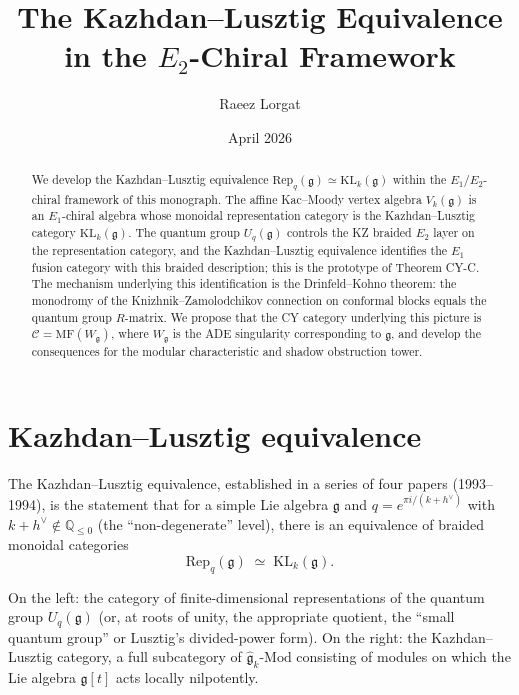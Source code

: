 \documentclass[11pt]{article}
\title{The Kazhdan--Lusztig Equivalence\\in the $E_2$-Chiral Framework}
\author{Raeez Lorgat}
\date{April 2026}
\theoremstyle{definition}
\theoremstyle{remark}
\newcommand{\Mod}{\mathrm{Mod}}
\newcommand{\Rep}{\mathrm{Rep}}
\newcommand{\MF}{\mathrm{MF}}
\newcommand{\Uq}{U_q}
\newcommand{\cC}{\mathcal{C}}
\newcommand{\frakg}{\mathfrak{g}}
\newcommand{\KL}{\mathrm{KL}}
\newcommand{\hv}{h^\vee}
\begin{document}
\maketitle

\begin{abstract}
We develop the Kazhdan--Lusztig equivalence $\Rep_q(\frakg) \simeq \KL_k(\frakg)$
within the $E_1$/$E_2$-chiral framework of this monograph.
The affine Kac--Moody vertex algebra $V_k(\frakg)$ is an $E_1$-chiral algebra
whose monoidal representation category is the Kazhdan--Lusztig category $\KL_k(\frakg)$.
The quantum group $\Uq(\frakg)$ controls the KZ braided $E_2$ layer on
the representation category, and the Kazhdan--Lusztig equivalence
identifies the $E_1$ fusion category with this braided description;
this is the prototype of Theorem CY-C.
The mechanism underlying this identification is the Drinfeld--Kohno theorem:
the monodromy of the Knizhnik--Zamolodchikov connection on conformal blocks
equals the quantum group $R$-matrix.
We propose that the CY category underlying this picture is $\cC = \MF(W_\frakg)$,
where $W_\frakg$ is the ADE singularity corresponding to $\frakg$,
and develop the consequences for the modular characteristic and shadow obstruction tower.
\end{abstract}

\tableofcontents

\section{Kazhdan--Lusztig equivalence}
\label{sec:kl-equivalence}

The Kazhdan--Lusztig equivalence, established in a series of four papers
\cite{KL1,KL2,KL3,KL4} (1993--1994), is the statement that
for a simple Lie algebra $\frakg$ and $q = e^{\pi i/(k+\hv)}$
with $k + \hv \notin \mathbb{Q}_{\le 0}$ (the ``non-degenerate'' level),
there is an equivalence of braided monoidal categories
\begin{equation}\label{eq:kl-equiv}
 \Rep_q(\frakg) \;\simeq\; \KL_k(\frakg).
\end{equation}

On the left: the category of finite-dimensional representations of the
quantum group $\Uq(\frakg)$ (or, at roots of unity, the appropriate
quotient, the ``small quantum group'' or Lusztig's divided-power form).
On the right: the Kazhdan--Lusztig category, a full subcategory of
$\hat{\frakg}_k\text{-}\Mod$ consisting of modules on which the Lie algebra
$\frakg[t]$ acts locally nilpotently.
\end{document}

